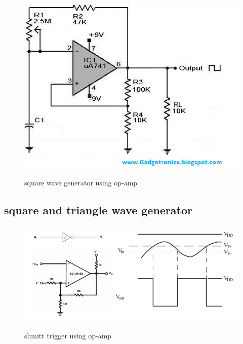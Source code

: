 \documentclass[11pt]{article}
\begin{document}
\begin{figure}[H]
    \begin{center}
        \includegraphics[scale=0.5]{Fig/square.png}
        \label{fig:square}
        \caption{square wave generator using op-amp}
    \end{center}
\end{figure}

\subsection{square and triangle wave generator}
\begin{figure}[H]
    \begin{center}
        \includegraphics[scale=0.5]{Fig/schmitt.png}
        \label{fig:schmitt}
        \caption{shmitt trigger using op-amp}
    \end{center}
\end{figure}
\end{document}

